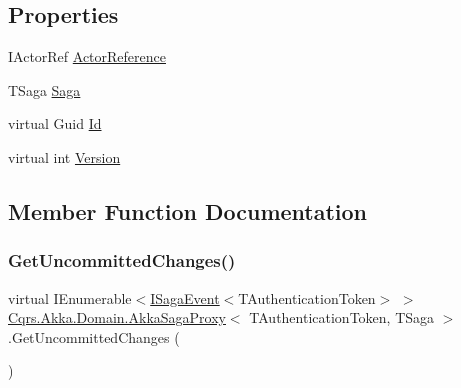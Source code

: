 \subsection*{Properties}
\begin{DoxyCompactItemize}
\item 
I\+Actor\+Ref \hyperlink{classCqrs_1_1Akka_1_1Domain_1_1AkkaSagaProxy_a5f1a7eae545d74336856ca7ec7625334_a5f1a7eae545d74336856ca7ec7625334}{Actor\+Reference}
\item 
T\+Saga \hyperlink{classCqrs_1_1Akka_1_1Domain_1_1AkkaSagaProxy_ac63a109e223eb4f046ebe9ad22b9a850_ac63a109e223eb4f046ebe9ad22b9a850}{Saga}
\item 
virtual Guid \hyperlink{classCqrs_1_1Akka_1_1Domain_1_1AkkaSagaProxy_acb65bb91f7dfacc6eca8e12b6a772b20_acb65bb91f7dfacc6eca8e12b6a772b20}{Id}
\item 
virtual int \hyperlink{classCqrs_1_1Akka_1_1Domain_1_1AkkaSagaProxy_ab6272400fe5c6227a11cf5c93f752d4d_ab6272400fe5c6227a11cf5c93f752d4d}{Version}
\end{DoxyCompactItemize}


\subsection{Member Function Documentation}
\mbox{\label{classCqrs_1_1Akka_1_1Domain_1_1AkkaSagaProxy_a8cad3415bc5474a01bfdb2db3a852ea5_a8cad3415bc5474a01bfdb2db3a852ea5}} 
\subsubsection{\texorpdfstring{Get\+Uncommitted\+Changes()}{GetUncommittedChanges()}}
{\footnotesize\ttfamily virtual I\+Enumerable$<$\hyperlink{interfaceCqrs_1_1Events_1_1ISagaEvent}{I\+Saga\+Event}$<$T\+Authentication\+Token$>$ $>$ \hyperlink{classCqrs_1_1Akka_1_1Domain_1_1AkkaSagaProxy}{Cqrs.\+Akka.\+Domain.\+Akka\+Saga\+Proxy}$<$ T\+Authentication\+Token, T\+Saga $>$.Get\+Uncommitted\+Changes (\begin{DoxyParamCaption}{ }\end{DoxyParamCaption})\hspace{0.3cm}{\ttfamily [virtual]}}




